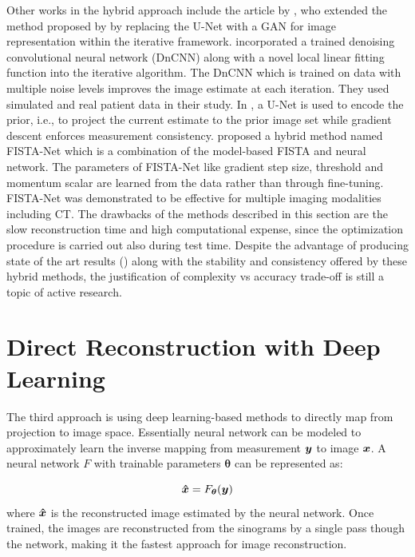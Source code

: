 Other works in the hybrid approach include the article by \cite{xie2019generative}, who extended the method proposed by \cite{gong2019iterative} by replacing the U-Net with a \ac{GAN} for image representation within the iterative framework. \cite{kim2018penalized} incorporated a trained denoising convolutional neural network (DnCNN) along with a novel local linear fitting function into the iterative algorithm. The DnCNN which is trained on data with multiple noise levels improves the image estimate at each iteration. They used simulated and real patient data in their study. In \cite{gupta2018cnn}, a U-Net is used to encode the prior, i.e., to project the current estimate to the prior image set while gradient descent enforces measurement consistency. \cite{xiang2021fista} proposed a hybrid method named FISTA-Net which is a combination of the model-based \ac{FISTA} and neural network. The parameters of FISTA-Net like gradient step size, threshold and momentum scalar are learned from the data rather than through fine-tuning. FISTA-Net was demonstrated to be effective for multiple imaging modalities including \ac{CT}. The drawbacks of the methods described in this section are the slow reconstruction time and high computational expense, since the optimization procedure is carried out also during test time. Despite the advantage of producing state of the art results (\cite{reader2020deep,leuschner2021quantitative}) along with the stability and consistency offered by these hybrid methods, the justification of complexity vs accuracy trade-off is still a topic of active research. 


\section{Direct Reconstruction with Deep Learning}

The third approach is using deep learning-based methods to directly map from projection to image space. Essentially neural network can be modeled to approximately learn the inverse mapping from measurement $\bm{y}$ to image $\bm{x}$. A neural network $F$ with trainable parameters $\bm{\theta}$ can be represented as:

\begin{equation}\label{eq:direct}
\bm{\hat{x}}=F_{\bm{\theta}}(\bm{y})
\end{equation}
where $\bm{\hat{x}}$ is the reconstructed image estimated by the neural network. Once trained, the images are reconstructed from the sinograms by a single pass though the network, making it the fastest approach for image reconstruction. 

